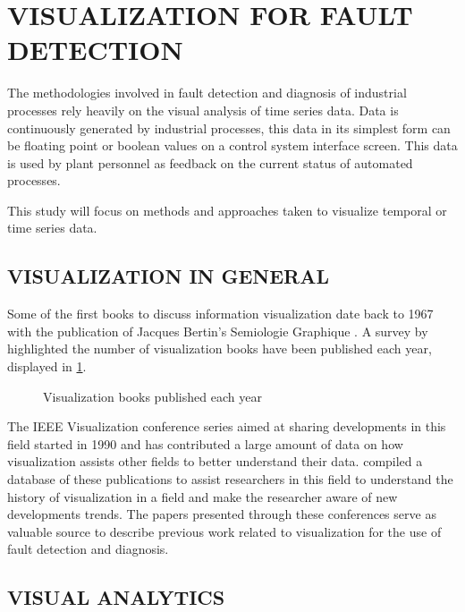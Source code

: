 \section{VISUALIZATION FOR FAULT DETECTION}

The methodologies involved in fault detection and diagnosis of industrial processes rely heavily on the visual analysis of time series data. Data is continuously generated by industrial processes, this data in its simplest form can be floating point or boolean values on a control system interface screen. This data is used by plant personnel as feedback on the current status of automated processes.

This study will focus on methods and approaches taken to visualize temporal or time series data. 

\subsection{VISUALIZATION IN GENERAL}

Some of the first books to discuss information visualization date back to 1967 with the publication of Jacques Bertin's Semiologie Graphique \cite{rees2019survey}. A survey by \cite{rees2019survey} highlighted the number of visualization books have been published each year, displayed in \ref{fig:1}.

\begin{figure}[!ht]
	
	\centering{}
	\caption{Visualization books published each year}\label{fig:1}
	
\end{figure}

The IEEE Visualization conference series aimed at sharing developments in this field started in 1990 and has contributed a large amount of data on how visualization assists other fields to better understand their data. \cite{isenberg2016vispubdata} compiled a database of these publications to assist researchers in this field to understand the history of visualization in a field and make the researcher aware of new developments trends. The papers presented through these conferences serve as valuable source to describe previous work related to visualization for the use of fault detection and diagnosis.

\subsection{VISUAL ANALYTICS}

